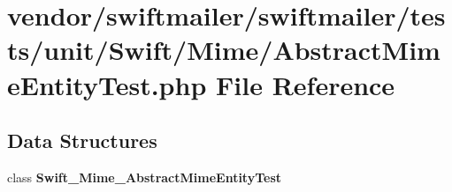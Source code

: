 \section{vendor/swiftmailer/swiftmailer/tests/unit/\+Swift/\+Mime/\+Abstract\+Mime\+Entity\+Test.php File Reference}
\label{_abstract_mime_entity_test_8php}
\subsection*{Data Structures}
\begin{DoxyCompactItemize}
\item 
class {\bf Swift\+\_\+\+Mime\+\_\+\+Abstract\+Mime\+Entity\+Test}
\end{DoxyCompactItemize}
